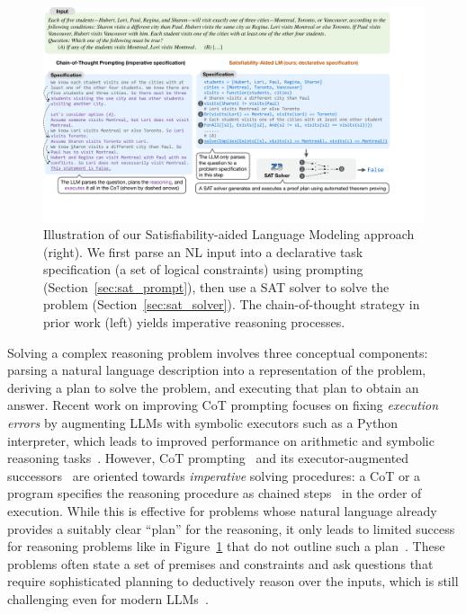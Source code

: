 \documentclass{article}
\theoremstyle{definition}
\begin{document}
\begin{figure}[t]
  \begin{center}
    \includegraphics[width=1.0\linewidth,trim=0 135 180 0,clip]{figures/framework_new.pdf}
  \end{center}
  \caption{Illustration of our Satisfiability-aided Language Modeling approach (right). We first parse an NL input into a declarative task specification (a set of logical constraints) using prompting (Section~\ref{sec:sat_prompt}), then use a SAT solver to solve the problem (Section~\ref{sec:sat_solver}). The chain-of-thought strategy in prior work (left) yields imperative reasoning processes.}

\label{fig:framework}
\end{figure}

%
Solving a complex reasoning problem involves three conceptual components: parsing a natural language description into a representation of the problem, deriving a plan to solve the problem, and executing that plan to obtain an answer.
Recent work on improving CoT prompting focuses on fixing \emph{execution errors} by augmenting LLMs with symbolic executors such as a Python interpreter, which leads to improved performance on arithmetic and symbolic reasoning tasks~\citep{pal,progcot,faithfulcot}. However, CoT prompting~\citep{chain,scratch} and its executor-augmented successors~\citep{pal,progcot,faithfulcot} are oriented towards \emph{imperative} solving procedures: a CoT or a program specifies the reasoning procedure as chained steps~\citep{chain,pal} in the order of execution. While this is effective for problems whose natural language already provides a suitably clear ``plan'' for the reasoning, it only leads to limited success for reasoning problems like in Figure~\ref{fig:framework} that do not outline such a plan~\citep{ribeiro2023street}. These problems often state a set of premises and constraints and ask questions that require sophisticated planning to deductively reason over the inputs, which is still challenging even for modern LLMs~\citep{Valmeekam2022LargeLM}.
\end{document}
